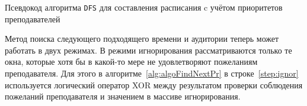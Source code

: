 \begin{algorithm} 
	\nonl{}
	\caption{Псевдокод алгоритма \texttt{DFS} для составления расписания c учётом приоритетов преподавателей}\label{alg:algoFindSolPr}
\end{algorithm} 

Метод поиска следующего подходящего времени и аудитории теперь может работать в двух режимах. В режими игнорирования рассматриваются только те окна, которые хотя бы в какой-то мере не удовлетворяют пожеланиям преподавателя. Для этого в алгоритме~\ref{alg:algoFindNextPr} в строке~\ref{step:ignor} используется логический оператор XOR между результатом проверки соблюдения пожеланий преподавателя и значением в массиве игнорирования.

